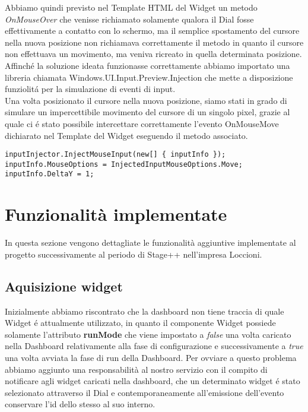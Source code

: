Abbiamo quindi previsto nel Template HTML del Widget un metodo \emph{OnMouseOver} che venisse richiamato solamente qualora il Dial fosse effettivamente a contatto con lo schermo, ma il semplice spostamento del cursore nella nuova posizione non richiamava correttamente il metodo in quanto il cursore non effettuava un movimento, ma veniva ricreato in quella determinata posizione.
Affinché la soluzione ideata funzionasse correttamente abbiamo importato una libreria chiamata Windows.UI.Input.Preview.Injection che mette a disposizione funziolitá per la simulazione di eventi di input.\\

Una volta posizionato il cursore nella nuova posizione, siamo stati in grado di simulare un impercettibile movimento del cursore di un singolo pixel, grazie al quale ci é stato possibile intercettare correttamente l’evento OnMouseMove dichiarato nel Template del Widget eseguendo il metodo associato.

\vspace{1.0cm}
\begin{lstlisting}[caption={Spostamento cursore},style=javaScriptCode]
inputInjector.InjectMouseInput(new[] { inputInfo });
inputInfo.MouseOptions = InjectedInputMouseOptions.Move;
inputInfo.DeltaY = 1;
\end{lstlisting} 
\vspace{1.0cm} 

\section{Funzionalità implementate}

In questa sezione vengono dettagliate le funzionalità aggiuntive implementate al progetto successivamente al periodo di Stage++ nell'impresa Loccioni.

\subsection{Aquisizione widget}

Inizialmente abbiamo riscontrato che la dashboard non tiene traccia di quale Widget é attualmente utilizzato, in quanto il componente Widget possiede solamente l'attributo \textbf{runMode} che viene impostato a \emph{false} una volta caricato nella Dashboard relativamente alla fase di configurazione e successivamente a \emph{true} una volta avviata la fase di run della Dashboard. Per ovviare a questo problema abbiamo aggiunto una responsabilità al nostro servizio con il compito di notificare agli widget caricati nella dashboard, che un determinato widget é stato selezionato attraverso il Dial e contemporaneamente all'emissione dell'evento conservare l'id dello stesso al suo interno.

